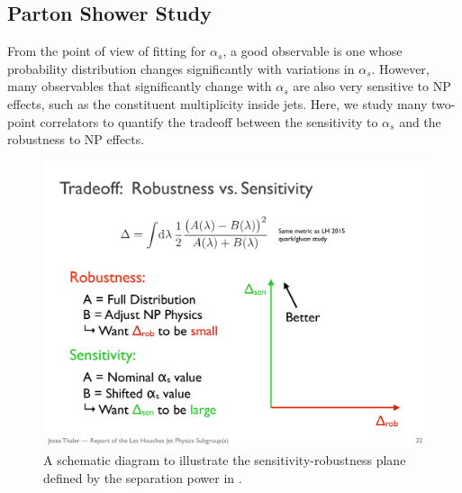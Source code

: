 \subsection{Parton Shower Study}


From the point of view of fitting for $\alpha_s$, a good observable is one whose probability distribution changes significantly with variations in $\alpha_s$.
%
However, many observables that significantly change with $\alpha_s$ are also very sensitive to NP effects, such as the constituent multiplicity inside jets.
%
Here, we study many two-point correlators to quantify the tradeoff between the sensitivity to $\alpha_s$ and the robustness to NP effects.

\begin{figure}[t]
\begin{center}
\includegraphics[width = 0.4\columnwidth]{figures/robustnessschematic.pdf}
\end{center}
\caption{A schematic diagram to illustrate the sensitivity-robustness plane defined by the separation power in .}
\label{fig:robustnessschematic}
\end{figure}

